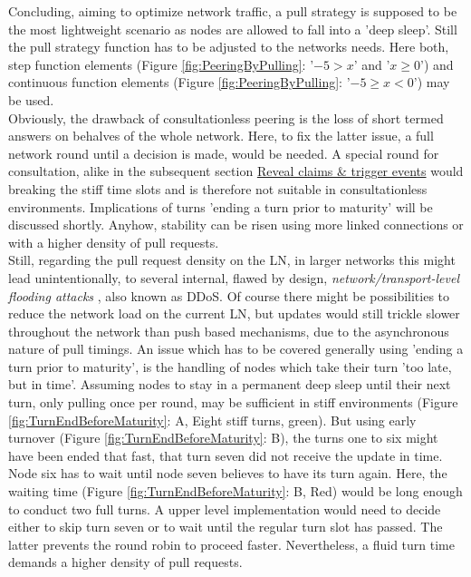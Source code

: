 \noindent Concluding, aiming to optimize network traffic, a pull strategy is supposed to be the most lightweight scenario as nodes are allowed to fall into a 'deep sleep'.
Still the pull strategy function has to be adjusted to the networks needs.
Here both, step function elements (Figure \ref{fig:PeeringByPulling}: '$-5 > x$' and '$x \geq 0$') and continuous function elements (Figure \ref{fig:PeeringByPulling}: '$-5 \geq x < 0$') may be used. \\
Obviously, the drawback of consultationless peering is the loss of short termed answers on behalves of the whole network.
Here, to fix the latter issue, a full network round until a decision is made, would be needed.
A special round for consultation, alike in the subsequent section \hyperref[sec:ClaimsAndTriggers]{Reveal claims \& trigger events}
would breaking the stiff time slots and is therefore not suitable in consultationless environments.
Implications of turns 'ending a turn prior to maturity' will be discussed shortly.
Anyhow, stability can be risen using more linked connections or with a higher density of pull requests. \\
Still, regarding the pull request density on the \gls{LN}, in larger networks this might lead unintentionally,
to several internal, flawed by design, \textit{network/transport-level flooding attacks} \cite[2046]{Zargar.2013}, also known as \gls{DDoS}.
Of course there might be possibilities to reduce the network load on the current \gls{LN},
but updates would still trickle slower throughout the network than push based mechanisms, due to the asynchronous nature of pull timings.	
An issue which has to be covered generally using 'ending a turn prior to maturity', is the handling of nodes which take their turn 'too late, but in time'.
Assuming nodes to stay in a permanent deep sleep until their next turn, only pulling once per round, may be sufficient in stiff environments (Figure \ref{fig:TurnEndBeforeMaturity}: A, Eight stiff turns, green).
But using early turnover (Figure \ref{fig:TurnEndBeforeMaturity}: B), the turns one to six might have been ended that fast, that turn seven did not receive the update in time.
Node six has to wait until node seven believes to have its turn again.
Here, the waiting time (Figure \ref{fig:TurnEndBeforeMaturity}: B, Red) would be long enough to conduct two full turns.
A upper level implementation would need to decide either to skip turn seven or to wait until the regular turn slot has passed.
The latter prevents the round robin to proceed faster.
Nevertheless, a fluid turn time demands a higher density of pull requests.
\begin{figure}
\end{figure}



